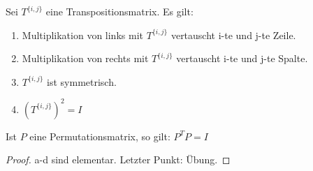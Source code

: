 \begin{lemma}
	Sei $T^{\{i,j\} }$ eine Transpositionsmatrix. Es gilt:
	\begin{enumerate}
		\item Multiplikation von links mit $T^{\{i,j\} }$ vertauscht i-te und j-te Zeile.
		\item Multiplikation von rechts mit $T^{\{i,j\} }$ vertauscht i-te und j-te Spalte. 
		\item $T^{\{i,j\} }$  ist symmetrisch. 
		\item $\left( T^{\{i,j\} } \right)^2=I$ 
	\end{enumerate}
	Ist $P$ eine Permutationsmatrix, so gilt: $P^{T}P=I$ 
\end{lemma}
\begin{proof}
a-d sind elementar. Letzter Punkt: Übung.
\end{proof}

